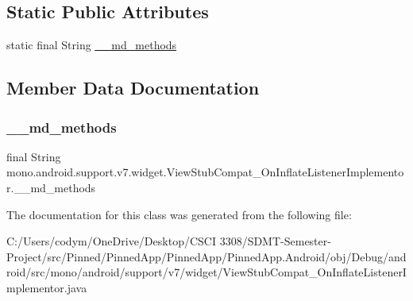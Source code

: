 \subsection*{Static Public Attributes}
\begin{DoxyCompactItemize}
\item 
static final String \hyperlink{classmono_1_1android_1_1support_1_1v7_1_1widget_1_1_view_stub_compat___on_inflate_listener_implementor_a75afa2a9c0ea491c4b7e56d95f3cbfcb}{\+\_\+\+\_\+md\+\_\+methods}
\end{DoxyCompactItemize}


\subsection{Member Data Documentation}
\mbox{\label{classmono_1_1android_1_1support_1_1v7_1_1widget_1_1_view_stub_compat___on_inflate_listener_implementor_a75afa2a9c0ea491c4b7e56d95f3cbfcb}} 
\subsubsection{\texorpdfstring{\+\_\+\+\_\+md\+\_\+methods}{\_\_md\_methods}}
{\footnotesize\ttfamily final String mono.\+android.\+support.\+v7.\+widget.\+View\+Stub\+Compat\+\_\+\+On\+Inflate\+Listener\+Implementor.\+\_\+\+\_\+md\+\_\+methods\hspace{0.3cm}{\ttfamily [static]}}



The documentation for this class was generated from the following file\+:\begin{DoxyCompactItemize}
\item 
C\+:/\+Users/codym/\+One\+Drive/\+Desktop/\+C\+S\+C\+I 3308/\+S\+D\+M\+T-\/\+Semester-\/\+Project/src/\+Pinned/\+Pinned\+App/\+Pinned\+App/\+Pinned\+App.\+Android/obj/\+Debug/android/src/mono/android/support/v7/widget/View\+Stub\+Compat\+\_\+\+On\+Inflate\+Listener\+Implementor.\+java\end{DoxyCompactItemize}
